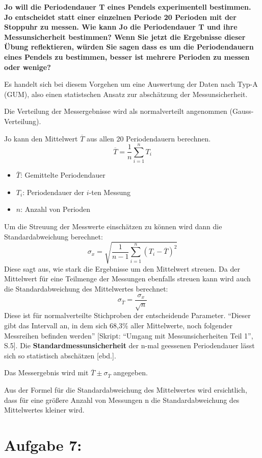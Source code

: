 \documentclass[
]{article}
\providecommand{\tightlist}{%
  \setlength{\itemsep}{0pt}\setlength{\parskip}{0pt}}
\begin{document}
\textbf{Jo will die Periodendauer T eines Pendels experimentell
bestimmen. Jo entscheidet statt einer einzelnen Periode 20 Perioden mit
der Stoppuhr zu messen. Wie kann Jo die Periodendauer T und ihre
Messunsicherheit bestimmen? Wenn Sie jetzt die Ergebnisse dieser Übung
reflektieren, würden Sie sagen dass es um die Periodendauern eines
Pendels zu bestimmen, besser ist mehrere Perioden zu messen oder
wenige?}

Es handelt sich bei diesem Vorgehen um eine Auswertung der Daten nach
Typ-A (GUM), also einen statistschen Ansatz zur abschätzung der
Messunsicherheit.

Die Verteilung der Messergebnisse wird als normalverteilt angenommen
(Gauss-Verteilung).

Jo kann den Mittelwert \(\overline{T}\) aus allen 20 Periodendauern
berechnen. \[\overline{T} = \frac{1}{n}\sum \limits_{i=1}^nT_i\]

\begin{itemize}
\tightlist
\item
  \(\bar{T}\): Gemittelte Periodendauer
\item
  \(T_i\): Periodendauer der \(i\)-ten Messung
\item
  \(n\): Anzahl von Perioden
\end{itemize}

Um die Streuung der Messwerte einschätzen zu können wird dann die
Standardabweichung berechnet:
\[\sigma_x = \sqrt{\frac{1}{n-1} \sum_{i=1}^n (T_i - \overline{T})^2}\]
Diese sagt aus, wie stark die Ergebnisse um den Mittelwert streuen. Da
der Mittelwert für eine Teilmenge der Messungen ebenfalls streuen kann
wird auch die Standardabweichung des Mittelwertes berechnet:
\[\sigma_{\overline{T}}=\frac{\sigma_x}{\sqrt{n}}\] Diese ist für
normalverteilte Stichproben der entscheidende Parameter. ``Dieser gibt
das Intervall an, in dem sich 68,3\% aller Mittelwerte, noch folgender
Messreihen befinden werden'' {[}Skript: ``Umgang mit Messunsicherheiten
Teil 1'', S.5{]}. Die \textbf{Standardmessunsicherheit} der n-mal
geessenen Periodendauer lässt sich so statistisch abschätzen {[}ebd.{]}.

Das Messergebnis wird mit \(\overline{T} \pm \sigma_{\overline{T}}\)
angegeben.

Aus der Formel für die Standardabweichung des Mittelwertes wird
ersichtlich, dass für eine größere Anzahl von Messungen n die
Standardabweichung des Mittelwertes kleiner wird.

\hypertarget{aufgabe-7}{%
\section{Aufgabe 7:}\label{aufgabe-7}}
\end{document}
